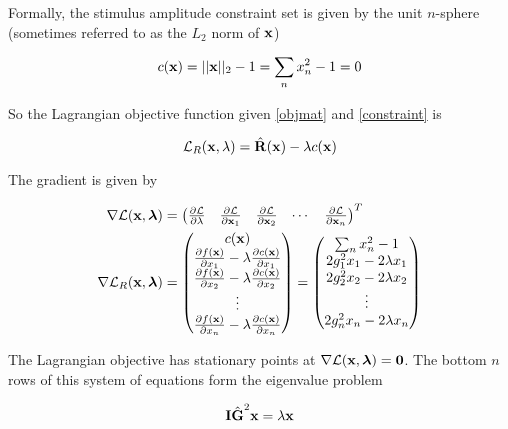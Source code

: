 \documentclass{article}
\newcommand{\Lagr}{\mathcal{L}}
\newcommand{\vect}[1]{\textbf{\textrm{#1}}}
\newcommand{\pd}[2]{\frac{\partial {#1}}{\partial {#2}}}
\begin{document}
Formally, the stimulus amplitude constraint set is given by the unit $n$-sphere (sometimes referred to as the $L_2$ norm of $\vect{x}$)

\begin{equation} \label{constraint}
	c(\vect{x}) = ||\vect{x}||_2 - 1 = \sum_n{x_n^2} - 1 = 0
\end{equation}

So the Lagrangian objective function given \eqref{objmat} and \eqref{constraint} is

\begin{equation}
	\Lagr_R(\vect{x},\lambda) = \hat{\vect{R}}(\vect{x}) - \lambda c(\vect{x})
\end{equation}

The gradient is given by

\begin{align} \label{lagrgrad}
	\nabla \Lagr(\vect{x},\bm{\lambda}) & = 
	\begin{pmatrix}
		\pd{\Lagr}{\lambda} & \pd{\Lagr}{\vect{x}_1} & \pd{\Lagr}{\vect{x}_2} 
		& \cdots & \pd{\Lagr}{\vect{x}_n}
	\end{pmatrix}^{T} \\
	\nabla \Lagr_R(\vect{x},\bm{\lambda})& = 
	\begin{pmatrix}
		c(\vect{x}) \\
		\pd{f(\vect{x})}{x_1} - \lambda \pd{c(\vect{x})}{x_1} \\
		\pd{f(\vect{x})}{x_2} - \lambda \pd{c(\vect{x})}{x_2}	\\	
		\vdots \\
		\pd{f(\vect{x})}{x_n} - \lambda \pd{c(\vect{x})}{x_n}
	\end{pmatrix} = 
	\begin{pmatrix}
		\sum_n{x_n^2} - 1 \\
		2 g_1^2 x_1 - 2 \lambda x_1 \\
		2 g_2^2 x_2 - 2 \lambda x_2 \\
		\vdots \\
		2 g_n^2 x_n - 2 \lambda x_n
	\end{pmatrix} \nonumber
\end{align}

The Lagrangian objective has stationary points at $\nabla \Lagr(\vect{x},\bm{\lambda}) = \vect{0}$.
The bottom $n$ rows of this system of equations form the eigenvalue problem

\begin{equation}
	\vect{I} \hat{\vect{G}}^2 \vect{x} = \lambda \vect{x}
\end{equation}
\end{document}
